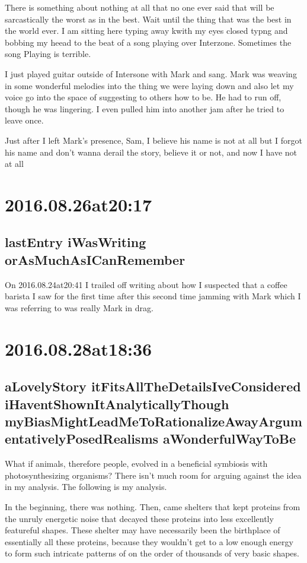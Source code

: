 There is something about nothing at all that no one ever said that will be sarcastically the worst as in the best. Wait until the thing that was the best in the world ever. I am sitting here typing away kwith my eyes closed typng and bobbing my heead to the beat of a song playing over Interzone. Sometimes the song Playing is terrible.

I just played guitar outside of Intersone with Mark and sang. Mark was weaving in some wonderful melodies into the thing we were laying down and also let my voice go into the space of suggesting to others how to be. He had to run off, though he was lingering. I even pulled him into another jam after he tried to leave once.

Just after I left Mark's presence, Sam, I believe his name is not at all but I forgot his name and don't wanna derail the story, believe it or not, and now I have not at all 

\section*{ 2016.08.26at20:17 }
\subsection*{lastEntry iWasWriting orAsMuchAsICanRemember}
On 2016.08.24at20:41 I trailed off writing about how I suspected that a coffee barista I saw for the first time after this second time jamming with Mark which I was referring to was really Mark in drag.

\section*{ 2016.08.28at18:36 }
\subsection*{ aLovelyStory itFitsAllTheDetailsIveConsidered iHaventShownItAnalyticallyThough myBiasMightLeadMeToRationalizeAwayArgumentativelyPosedRealisms aWonderfulWayToBe }
What if animals, therefore people, evolved in a beneficial symbiosis with photosynthesizing organisms? There isn't much room for arguing against the idea in my analysis. The following is my analysis.

In the beginning, there was nothing. Then, came shelters that kept proteins from the unruly energetic noise that decayed these proteins into less excellently featureful shapes. These shelter may have necessarily been the birthplace of essentially all these proteins, because they wouldn't get to a low enough energy to form such intricate patterns of on the order of thousands of very basic shapes.

